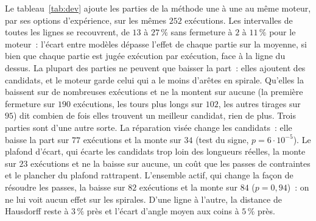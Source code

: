 \documentclass[11pt,a4paper]{article}
\begin{document}
Le tableau~\ref{tab:dev} ajoute les parties de la méthode une à une au même
moteur, par ses options d'expérience, sur les mêmes $252$ exécutions. Les
intervalles de toutes les lignes se recouvrent, de $13$ à $27\,\%$ sans
fermeture à $2$ à $11\,\%$ pour le moteur~: l'écart entre modèles dépasse
l'effet de chaque partie sur la moyenne, si bien que chaque partie est jugée
exécution par exécution, face à la ligne du dessus. La plupart des parties
ne peuvent que baisser la part~: elles ajoutent des candidats, et le moteur
garde celui qui a le moins d'arêtes en spirale. Qu'elles la baissent sur de
nombreuses exécutions et ne la montent sur aucune (la première fermeture sur
$190$ exécutions, les tours plus longs sur $102$, les autres tirages sur
$95$) dit combien de fois elles trouvent un meilleur candidat, rien de plus.
Trois parties sont d'une autre sorte. La réparation visée change les
candidats~: elle baisse la part sur $77$ exécutions et la monte sur $34$
(test du signe, $p = 6 \cdot 10^{-5}$). Le plafond d'écart, qui écarte les
candidats trop loin des longueurs réelles, la monte sur $23$ exécutions et
ne la baisse sur aucune, un coût que les passes de contraintes et le
plancher du plafond rattrapent. L'ensemble actif, qui change la façon de
résoudre les passes, la baisse sur $82$ exécutions et la monte sur $84$
($p = 0,94$)~: on ne lui voit aucun effet sur les spirales. D'une ligne à
l'autre, la distance de Hausdorff reste à $3\,\%$ près et l'écart d'angle
moyen aux coins à $5\,\%$ près.
\end{document}
